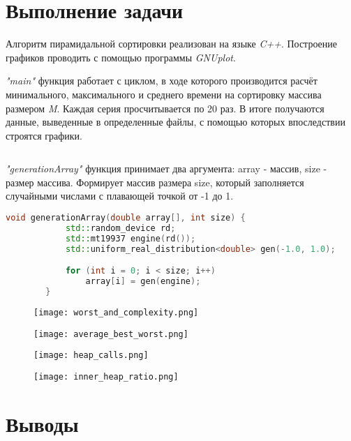 \documentclass[12pt, a4paper]{report}
\begin{document}
	\section*{Выполнение задачи}
	Алгоритм пирамидальной сортировки реализован на языке \textit{C++}. Построение графиков проводить с помощью программы \textit{GNUplot}.

	\textit{"main"} функция работает с циклом, в ходе которого производится расчёт минимального, максимального и среднего времени на сортировку массива размером \textit{M}. Каждая серия просчитывается по 20 раз. В итоге получаются данные, выведенные в определенные файлы, с помощью которых впоследствии строятся графики.
	\lstset{style=mystyle}
	\begin{lstlisting}[language=C++]

	\end{lstlisting}

	\textit{"generationArray"} функция принимает два аргумента: array - массив, size - размер массива. Формирует массив размера size, который заполняется случайными числами с плавающей точкой от -1 до 1.
	\lstset{style=mystyle}
	\begin{lstlisting}[language=C++]
		void generationArray(double array[], int size) {
			std::random_device rd;
			std::mt19937 engine(rd());
			std::uniform_real_distribution<double> gen(-1.0, 1.0);

			for (int i = 0; i < size; i++)
				array[i] = gen(engine);
		}		
	\end{lstlisting}

	\newpage
	\vfill

	\begin{figure}
		\texttt{[image: worst\_and\_complexity.png]}
	\end{figure}
	\begin{figure}
		\texttt{[image: average\_best\_worst.png]}
	\end{figure}
	\begin{figure}
		\texttt{[image: heap\_calls.png]}
	\end{figure}
	\begin{figure}
		\texttt{[image: inner\_heap\_ratio.png]}
	\end{figure}

	\vfill
	\clearpage

	\section*{Выводы}
\end{document}
